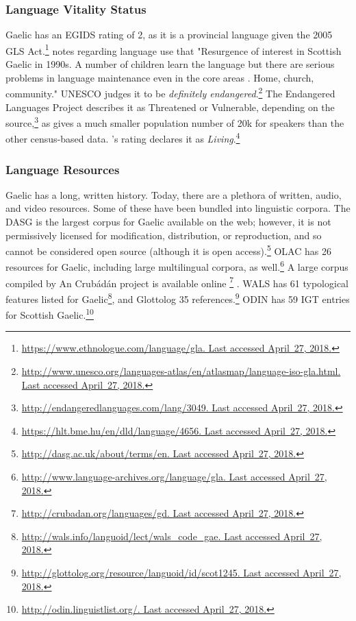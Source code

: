 \subsubsection{Language Vitality Status}

Gaelic has an EGIDS rating of 2, as it is a provincial language given the 2005 GLS Act.\footnote{\href{https://www.ethnologue.com/language/gla}{https://www.ethnologue.com/language/gla. Last accessed April~27, 2018.}}  \citet{lewis2009ethnologue} notes regarding language use that "Resurgence of interest in Scottish Gaelic in 1990s. A number of children learn the language but there are serious problems in language maintenance even in the core areas \citep{salminen2007endangered}. Home, church, community." UNESCO judges it to be {\it definitely endangered}.\footnote{\href{http://www.unesco.org/languages-atlas/en/atlasmap/language-iso-gla.html}{http://www.unesco.org/languages-atlas/en/atlasmap/language-iso-gla.html. Last accessed April~27, 2018.}} The Endangered Languages Project describes it as Threatened or Vulnerable, depending on the source,\footnote{\href{http://endangeredlanguages.com/lang/3049}{http://endangeredlanguages.com/lang/3049. Last accessed April~27, 2018.}} as \citet{salminen2007europe} gives a much smaller population number of 20k for speakers than the other census-based data. \citet{kornai2013digital}'s rating declares it as {\it Living}.\footnote{\href{https://hlt.bme.hu/en/dld/language/4656}{https://hlt.bme.hu/en/dld/language/4656. Last accessed April~27, 2018.}} 

\subsubsection{Language Resources}
\label{subsec:gaelic-resources}

Gaelic has a long, written history. Today, there are a plethora of written, audio, and video resources. Some of these have been bundled into linguistic corpora. The DASG is the largest corpus for Gaelic available on the web; however, it is not permissively licensed for modification, distribution, or reproduction, and so cannot be considered open source (although it is open access).\footnote{\href{http://dasg.ac.uk/about/terms/en}{http://dasg.ac.uk/about/terms/en. Last accessed April~27, 2018.}} OLAC has 26 resources for Gaelic, including large multilingual corpora, as well.\footnote{\href{http://www.language-archives.org/language/gla}{http://www.language-archives.org/language/gla. Last accessed April~27, 2018.}} A large corpus compiled by An Crub\'ad\'an project is available online \footnote{\href{http://crubadan.org/languages/gd}{http://crubadan.org/languages/gd. Last accessed April~27, 2018.}} \citep{scannell2007crubadan}. WALS has 61 typological features listed for Gaelic\footnote{\href{http://wals.info/languoid/lect/wals_code_gae}{http://wals.info/languoid/lect/wals\_code\_gae. Last accessed April~27, 2018.}}, and Glottolog 35 references.\footnote{\href{http://glottolog.org/resource/languoid/id/scot1245}{http://glottolog.org/resource/languoid/id/scot1245. Last accessed April~27, 2018.}} ODIN has 59 IGT entries for Scottish Gaelic.\footnote{\href{http://odin.linguistlist.org/}{http://odin.linguistlist.org/. Last accessed April~27, 2018.}}

